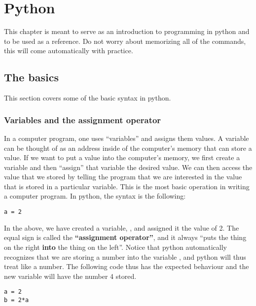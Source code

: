 \chapter{Python}
This chapter is meant to serve as an introduction to programming in python and to be used as a reference. Do not worry about memorizing all of the commands, this will come automatically with practice.

\section{The basics}
This section covers some of the basic syntax in python.
\subsection{Variables and the assignment operator}
In a computer program, one uses ``variables'' and assigns them values. A variable can be thought of as an address inside of the computer's memory that can store a value. If we want to put a value into the computer's memory, we first create a variable and then ``assign'' that variable the desired value. We can then access the value that we stored by telling the program that we are interested in the value that is stored in a particular variable. This is the most basic operation in writing a computer program. In python, the syntax is the following:
\begin{lstlisting}[frame=single] 
a = 2 
\end{lstlisting}

In the above, we have created a variable, , and assigned it the value of 2. The equal sign is called the \textbf{``assignment operator''}, and it always ``puts the thing on the right \textbf{into} the thing on the left''. Notice that python automatically recognizes that we are storing a number into the variable , and python will thus treat  like a number. The following code thus has the expected behaviour and the new variable  will have the number 4 stored.

\begin{lstlisting}[frame=single] 
a = 2 
b = 2*a
\end{lstlisting}

